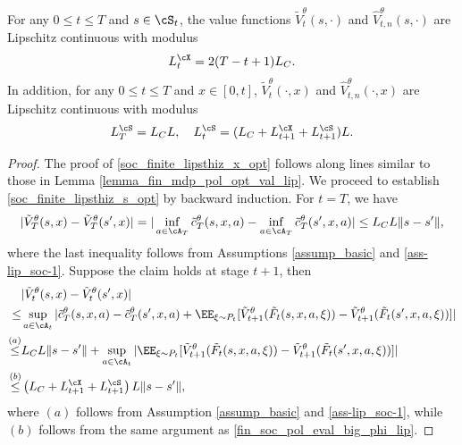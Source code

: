 \documentclass[9pt]{article}
\numberwithin{equation}{section}
\begin{document}
\begin{lemma} \label{lemma_fin_soc_pol_opt_lip_X}
    For any $0 \leq t \leq T$ and $s \in \cS_t$, the value functions $\tilde V_t^\theta(s, \cdot)$ and $\hat V_{t,n}^\theta(s, \cdot)$ are Lipschitz continuous with modulus
    \begin{align}\label{soc_finite_lipsthiz_x_opt}
    L^\cX_{t} = 2(T-t+1)L_C.
    \end{align}
    In addition, 
     for any $0 \leq t \leq T$ and $x \in [0,t]$, $\tilde V_t^\theta(\cdot, x)$ and $\hat V_{t,n}^{\theta}(\cdot, x)$ are Lipschitz continuous with modulus
    \begin{align}
    L^\cS_T  = L_C L , ~~~
        L^\cS_{t}  = (L_C + L^\cX_{t+1} + L^\cS_{t+1})L . \label{soc_finite_lipsthiz_s_opt}
    \end{align}

\end{lemma}

\begin{proof}
The proof of \eqref{soc_finite_lipsthiz_x_opt} follows along lines similar to those in Lemma \ref{lemma_fin_mdp_pol_opt_val_lip}.
We proceed to establish \eqref{soc_finite_lipsthiz_s_opt} by backward induction.
 For $t = T$, we have
 \begin{align}
     |\tilde V_T^\theta(s,x) - \tilde V_T^{\theta}(s',x)| = \large| \inf_{a \in \cA_T} \tilde{c}_T^\theta(s,x,a) - \inf_{a \in \cA_T} \tilde{c}_T^\theta(s',x,a)\large| \leq L_C L \|s - s'\|, \nonumber
 \end{align}
    where the last inequality follows from Assumptions \ref{assump_basic} and \ref{ass-lip_soc-1}.  
    Suppose the claim holds at stage $t+1$, then 
    \begin{align*}
        & |\tilde V_t^\theta(s,x) - \tilde V_t^{\theta}(s',x)|\\
        \leq & \sup_{a \in \cA_t} |\tilde{c}_T^\theta(s,x,a) - \tilde{c}_T^\theta(s',x,a) + \EE_{\xi \sim P_t}[ \tilde V_{t+1}^\theta( \tilde F_t(s,x,a,\xi)) - \tilde V_{t+1}^\theta( \tilde F_{t}(s',x,a,\xi))]| \\
        \overset{(a)}{\leq} & L_C L  \|s - s'\| + \sup_{a \in \cA_t}|\EE_{\xi \sim P_t}[ \tilde V_{t+1}^\theta( \tilde F_t(s,x,a,\xi)) - \tilde V_{t+1}^\theta( \tilde F_{t}(s',x,a,\xi))]| \\
        \overset{(b)}{\leq} & \left(L_C + L^\cX_{t+1} + L^\cS_{t+1}\right) L \|s - s'\|,
    \end{align*}
    where $(a)$ follows from Assumption  \ref{assump_basic} and \ref{ass-lip_soc-1}, while $(b)$ follows from the same argument as \eqref{fin_soc_pol_eval_big_phi_lip}.
\end{proof}
\end{document}
